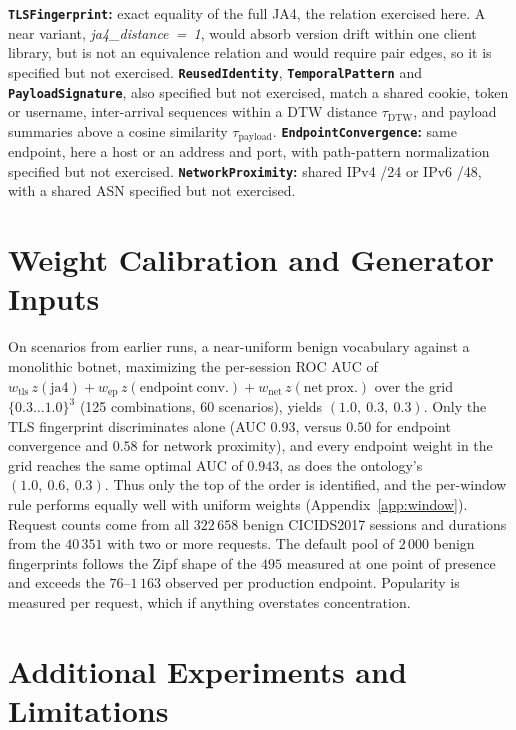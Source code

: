 \documentclass[conference,letterpaper,10pt]{IEEEtran}
\newcommand\1{\textit{(i)}}
\newcommand\2{\textit{(ii)}}
\newcommand\3{\textit{(iii)}}
\newcommand\4{\textit{(iv)}}
\newcommand\5{\textit{(v)}}
\newcommand\6{\textit{(vi)}}
\newcommand\7{\textit{(vii)}}
\newcommand\8{\textit{(viii)}}
\newcommand\9{\textit{(ix)}}
\begin{document}
\textbf{\texttt{TLSFingerprint}:} exact equality of the full JA4, the relation
exercised here. A near variant, \mbox{\textit{ja4\_distance = 1}}, would absorb version drift within one client library, but is not an equivalence relation and would require pair edges, so it is specified but not exercised. \textbf{\texttt{ReusedIdentity}}, \textbf{\texttt{TemporalPattern}} and \textbf{\texttt{PayloadSignature}}, also specified but not exercised, match a shared cookie, token or username, inter-arrival sequences within a DTW distance $\tau_{\mathrm{DTW}}$, and payload summaries above a cosine similarity $\tau_{\mathrm{payload}}$. \textbf{\texttt{EndpointConvergence}:} same endpoint, here a host or an address and port, with path-pattern normalization specified but not exercised. \textbf{\texttt{NetworkProximity}:} shared IPv4 /24 or IPv6 /48, with a shared ASN specified but not exercised.

\section{Weight Calibration and Generator Inputs}
\label{app:calibration}

On scenarios from earlier runs, a near-uniform benign vocabulary against a monolithic botnet, maximizing the per-session ROC AUC of $w_{\mathrm{tls}}\,z(\mathrm{ja4}) + w_{\mathrm{ep}}\,z(\mathrm{endpoint\ conv.}) + w_{\mathrm{net}}\,z(\mathrm{net\ prox.})$ over the grid $\{0.3\ldots1.0\}^3$ (125 combinations, 60 scenarios), yields $(1.0,\ 0.3,\ 0.3)$. Only the TLS fingerprint discriminates alone (AUC $0.93$, versus $0.50$ for endpoint convergence and $0.58$ for network proximity), and every endpoint weight in the grid reaches the same optimal AUC of $0.943$, as does the ontology's $(1.0,\ 0.6,\ 0.3)$. Thus only the top of the order is identified, and the per-window rule performs equally well with uniform weights (Appendix~\ref{app:window}). Request counts come from all $322\,658$ benign CICIDS2017 sessions and durations from the $40\,351$ with two or more requests. The default pool of $2\,000$ benign fingerprints follows the Zipf shape of the $495$ measured at one point of presence and exceeds the $76$--$1\,163$ observed per production endpoint. Popularity is measured per request, which if anything overstates concentration.

\section{Additional Experiments and Limitations}
\label{app:limitations}
\end{document}
